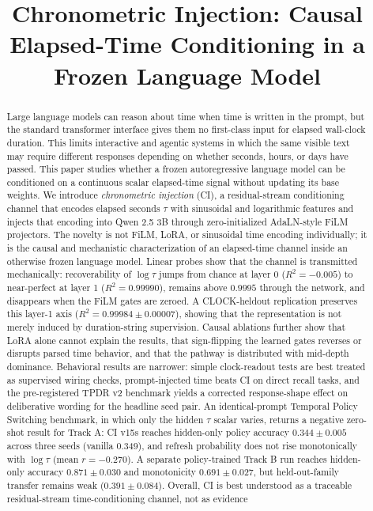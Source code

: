 \documentclass[conference,10pt]{IEEEtran}
\newcommand{\CI}{\textsc{CI}}
\newcommand{\Tau}{\tau}
\begin{document}
\title{Chronometric Injection: Causal Elapsed-Time Conditioning in a Frozen Language Model}

\author{%
}

\maketitle

\begin{abstract}
Large language models can reason about time when time is written in the prompt, but the standard transformer interface gives them no first-class input for elapsed wall-clock duration. This limits interactive and agentic systems in which the same visible text may require different responses depending on whether seconds, hours, or days have passed. This paper studies whether a frozen autoregressive language model can be conditioned on a continuous scalar elapsed-time signal without updating its base weights. We introduce \emph{chronometric injection} (\CI), a residual-stream conditioning channel that encodes elapsed seconds $\Tau$ with sinusoidal and logarithmic features and injects that encoding into Qwen 2.5 3B through zero-initialized AdaLN-style FiLM projectors. The novelty is not FiLM, LoRA, or sinusoidal time encoding individually; it is the causal and mechanistic characterization of an elapsed-time channel inside an otherwise frozen language model. Linear probes show that the channel is transmitted mechanically: recoverability of $\log \Tau$ jumps from chance at layer 0 ($R^2=-0.005$) to near-perfect at layer 1 ($R^2=0.99990$), remains above $0.9995$ through the network, and disappears when the FiLM gates are zeroed. A CLOCK-heldout replication preserves this layer-1 axis ($R^2=0.99984\pm0.00007$), showing that the representation is not merely induced by duration-string supervision. Causal ablations further show that LoRA alone cannot explain the results, that sign-flipping the learned gates reverses or disrupts parsed time behavior, and that the pathway is distributed with mid-depth dominance. Behavioral results are narrower: simple clock-readout tests are best treated as supervised wiring checks, prompt-injected time beats \CI{} on direct recall tasks, and the pre-registered TPDR v2 benchmark yields a corrected response-shape effect on deliberative wording for the headline seed pair. An identical-prompt Temporal Policy Switching benchmark, in which only the hidden $\Tau$ scalar varies, returns a negative zero-shot result for Track A: \CI{} v15s reaches hidden-only policy accuracy $0.344\pm0.005$ across three seeds (vanilla 0.349), and refresh probability does not rise monotonically with $\log\Tau$ (mean $r=-0.270$). A separate policy-trained Track B run reaches hidden-only accuracy $0.871\pm0.030$ and monotonicity $0.691\pm0.027$, but held-out-family transfer remains weak ($0.391\pm0.084$). Overall, \CI{} is best understood as a traceable residual-stream time-conditioning channel, not as evidence 
\end{abstract}
\end{document}
